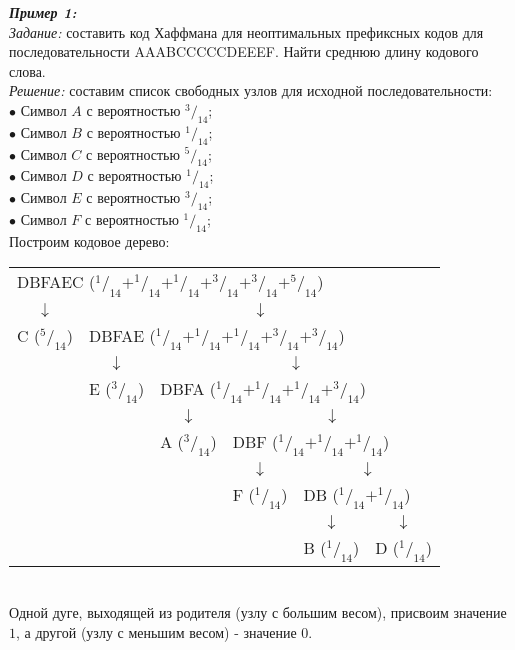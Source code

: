 \emph{\textbf{Пример 1:}}
\\\emph{Задание:} составить код Хаффмана для неоптимальных префиксных кодов для последовательности AAABCCCCCDEEEF. Найти среднюю длину кодового слова.
\\\emph{Решение:} составим список свободных узлов для исходной последовательности:
\\$\bullet$ Символ $A$ с вероятностью $^3/_{14}$;
\\$\bullet$ Символ $B$ с вероятностью $^1/_{14}$;
\\$\bullet$ Символ $C$ с вероятностью $^5/_{14}$;
\\$\bullet$ Символ $D$ с вероятностью $^1/_{14}$;
\\$\bullet$ Символ $E$ с вероятностью $^3/_{14}$;
\\$\bullet$ Символ $F$ с вероятностью $^1/_{14}$;
\\Построим кодовое дерево:
\begin{table}[h]
\centering
\begin{tabular}{c c c c c c}
\multicolumn{6}{l}{DBFAEC ($^1/_{14} + ^1/_{14} + ^1/_{14} + ^3/_{14} + ^3/_{14} + ^5/_{14}$)} \\
$\downarrow$ & \multicolumn{5}{c}{$\downarrow$} \\
C ($^5/_{14}$) & \multicolumn{5}{l}{DBFAE ($^1/_{14} + ^1/_{14} + ^1/_{14} + ^3/_{14} + ^3/_{14}$)} \\
& $\downarrow$ & \multicolumn{4}{c}{$\downarrow$} \\
& E ($^3/_{14}$) & \multicolumn{4}{l}{DBFA ($^1/_{14} + ^1/_{14} + ^1/_{14} + ^3/_{14}$)} \\
& & $\downarrow$ & \multicolumn{3}{c}{$\downarrow$} \\
& & A ($^3/_{14}$) & \multicolumn{3}{l}{DBF ($^1/_{14} + ^1/_{14} + ^1/_{14}$)} \\
& & & $\downarrow$ & \multicolumn{2}{c}{$\downarrow$} \\
& & & F ($^1/_{14}$) & \multicolumn{2}{l}{DB ($^1/_{14} + ^1/_{14}$)} \\
& & & & $\downarrow$ & $\downarrow$ \\
& & & & B ($^1/_{14}$) & D ($^1/_{14}$) \\
\end{tabular}
\end{table}
\\Одной дуге, выходящей из родителя (узлу с большим весом), присвоим значение $1$, а другой (узлу с меньшим весом) - значение $0$.
